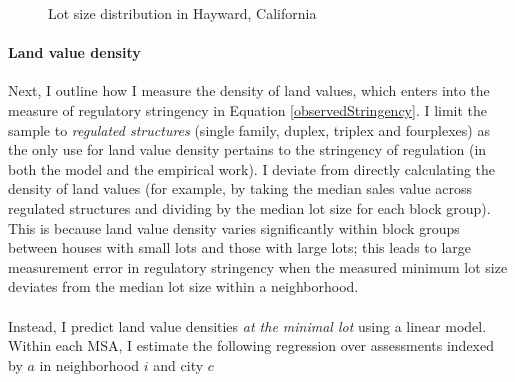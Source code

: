 \documentclass[12pt]{article}
\begin{document}
	\begin{figure}[htbp!]
		\caption{Lot size distribution in Hayward, California}\label{figure:Bunching}
		
	\end{figure}
	
	\paragraph*{Land value density}
	Next, I outline how I measure the density of land values, which enters into the measure of regulatory stringency in Equation \eqref{observedStringency}. I limit the sample to \textit{regulated structures} (single family, duplex, triplex and fourplexes) as the only use for land value density pertains to the stringency of regulation (in both the model and the empirical work). I deviate from directly calculating the density of land values (for example, by taking the median sales value across regulated structures and dividing by the median lot size for each block group). This is because land value density varies significantly within block groups between houses with small lots and those with large lots; this leads to large measurement error in regulatory stringency when the measured minimum lot size deviates from the median lot size within a neighborhood.
	
	\paragraph*{}
	Instead, I predict land value densities \textit{at the minimal lot} using a linear model. Within each MSA, I estimate the following regression over assessments indexed by $a$ in neighborhood $i$ and city $c$
	
\end{document}
